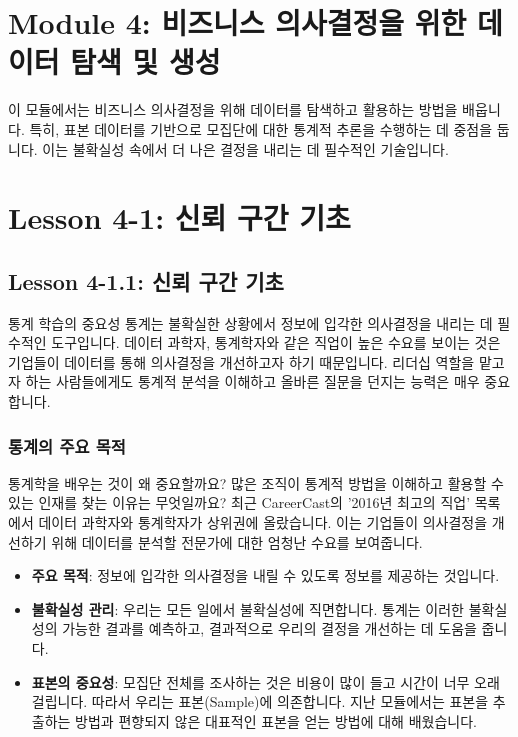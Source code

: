 \documentclass[11pt,a4paper]{article}
\begin{document}
\newpage
\section{Module 4: 비즈니스 의사결정을 위한 데이터 탐색 및 생성}

이 모듈에서는 비즈니스 의사결정을 위해 데이터를 탐색하고 활용하는 방법을 배웁니다. 특히, 표본 데이터를 기반으로 모집단에 대한 통계적 추론을 수행하는 데 중점을 둡니다. 이는 불확실성 속에서 더 나은 결정을 내리는 데 필수적인 기술입니다.

\newpage
\section{Lesson 4-1: 신뢰 구간 기초}

\subsection{Lesson 4-1.1: 신뢰 구간 기초}

\begin{summarybox}{통계 학습의 중요성}
  통계는 불확실한 상황에서 정보에 입각한 의사결정을 내리는 데 필수적인 도구입니다.
  데이터 과학자, 통계학자와 같은 직업이 높은 수요를 보이는 것은 기업들이 데이터를 통해 의사결정을 개선하고자 하기 때문입니다.
  리더십 역할을 맡고자 하는 사람들에게도 통계적 분석을 이해하고 올바른 질문을 던지는 능력은 매우 중요합니다.
\end{summarybox}

\subsubsection*{통계의 주요 목적}
통계학을 배우는 것이 왜 중요할까요? 많은 조직이 통계적 방법을 이해하고 활용할 수 있는 인재를 찾는 이유는 무엇일까요?
최근 CareerCast의 '2016년 최고의 직업' 목록에서 데이터 과학자와 통계학자가 상위권에 올랐습니다. 이는 기업들이 의사결정을 개선하기 위해 데이터를 분석할 전문가에 대한 엄청난 수요를 보여줍니다.

\begin{itemize}
    \item \textbf{주요 목적}: 정보에 입각한 의사결정을 내릴 수 있도록 정보를 제공하는 것입니다.
    \item \textbf{불확실성 관리}: 우리는 모든 일에서 불확실성에 직면합니다. 통계는 이러한 불확실성의 가능한 결과를 예측하고, 결과적으로 우리의 결정을 개선하는 데 도움을 줍니다.
    \item \textbf{표본의 중요성}: 모집단 전체를 조사하는 것은 비용이 많이 들고 시간이 너무 오래 걸립니다. 따라서 우리는 표본(Sample)에 의존합니다. 지난 모듈에서는 표본을 추출하는 방법과 편향되지 않은 대표적인 표본을 얻는 방법에 대해 배웠습니다.
\end{itemize}
\end{document}
